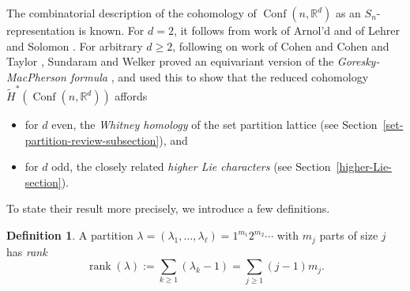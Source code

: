 \documentclass[12pt]{amsart}
\theoremstyle{plain}
\theoremstyle{definition}
\newtheorem{defn}[thm]{Definition}
\begin{document}
The combinatorial description of the cohomology of ${{\operatorname{Conf}}}(n,{{\mathbb{R}}}^d)$ 
as an $S_n$-representation is known.
For $d=2$, it follows from work of Arnol'd \cite{Arnold} and of 
Lehrer and Solomon \cite{LehrerSolomon}.
For arbitrary $d \geq 2$, following on work
of Cohen \cite[Chap. III]{CohenLadaMay} and
Cohen and Taylor \cite{CohenTaylor},
Sundaram and Welker \cite{SundaramWelker}  
proved an equivariant version \cite[Theorem 2.5]{SundaramWelker}
of 
the {\it Goresky-MacPherson formula} \cite[III.1.3 Thm. A]{GoreskyMacPherson},
and used this to show that the reduced cohomology $\tilde{H}^*({{\operatorname{Conf}}}(n,{{\mathbb{R}}}^d))$ affords
\begin{itemize}
\item for $d$ even, the {\it Whitney homology} of the set 
partition lattice (see Section~\ref{set-partition-review-subsection}), and 
\item for $d$ odd, the closely 
related {\it higher Lie characters} (see Section~\ref{higher-Lie-section}).
\end{itemize}
To state their result more precisely,
we introduce a few definitions.

\begin{defn}
A partition 
$
\lambda=(\lambda_1,  \ldots, \lambda_\ell)
       =1^{m_1} 2^{m_2} \cdots
$
with $m_j$ parts of size $j$ has {\it rank}
$$
{{\operatorname{rank}}}(\lambda)
 := \sum_{k \geq 1}(\lambda_k-1)
  = \sum_{j \geq 1}(j-1)m_j.
$$
\end{defn}
\end{document}
